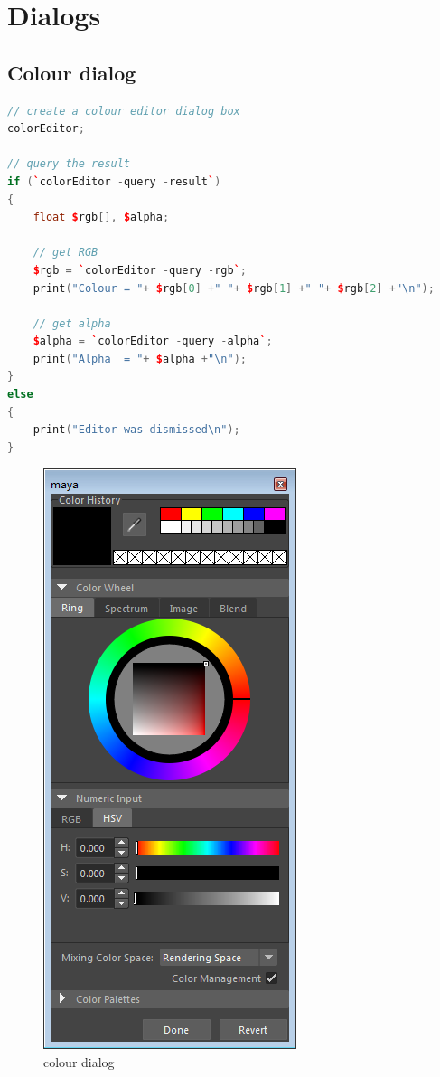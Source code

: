 \section{Dialogs}

\subsection{Colour dialog}

\begin{lstlisting}[language=C++]
// create a colour editor dialog box
colorEditor;

// query the result
if (`colorEditor -query -result`)
{
	float $rgb[], $alpha;
	
	// get RGB
	$rgb = `colorEditor -query -rgb`;
	print("Colour = "+ $rgb[0] +" "+ $rgb[1] +" "+ $rgb[2] +"\n");
	
	// get alpha
	$alpha = `colorEditor -query -alpha`;
	print("Alpha  = "+ $alpha +"\n");
}
else
{
	print("Editor was dismissed\n");
}

\end{lstlisting}

\begin{figure}[tbh]
	\centering
	\includegraphics[width=0.5\linewidth]{figures/dialog_color}
	\caption{colour dialog}
	\label{fig:dialogcolor}
\end{figure}

